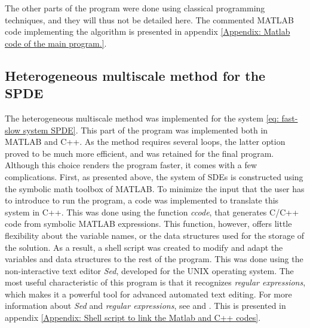 The other parts of the program were done using classical programming techniques, and they will thus not be detailed here. The commented MATLAB code implementing the algorithm is presented in appendix \ref{Appendix: Matlab code of the main program.}.

\subsection{Heterogeneous multiscale method for the SPDE}
\label{sub:Heterogeneous multiscale method for the SPDE}
The heterogeneous multiscale method was implemented for the system
\eqref{eq: fast-slow system SPDE}. This part of the program was implemented both in
MATLAB and C++. As the method requires several loops, the latter option proved
to be much more efficient, and was retained for the final program. Although this
choice renders the program faster, it comes with a few complications. First, as
presented above, the system of SDEs is constructed using the symbolic math
toolbox of MATLAB. To minimize the input that the user has to introduce to run
the program, a code was implemented to translate this system in C++. This was
done using the function \emph{ccode}, that generates C/C++ code from symbolic
MATLAB expressions. This function, however, offers little flexibility about the
variable names, or the data structures used for the storage of the solution. As
a result, a shell script was created to modify and adapt the variables and
data structures to the rest of the program. This was done using the
non-interactive text editor \emph{Sed}, developed for the UNIX operating
system. The most useful characteristic of this program is that it recognizes
\emph{regular expressions}, which makes it a powerful tool for advanced
automated text editing. For more information about \emph{Sed} and \emph{regular
    expressions}, see \cite{mcmahon1979sed} and \cite{friedl2002mastering}. 
This is presented in appendix \ref{Appendix: Shell script to link the Matlab and C++ codes}.




